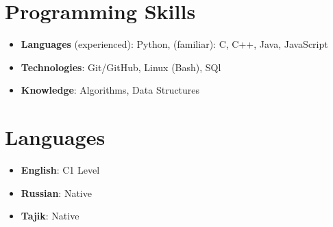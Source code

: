 \documentclass[letterpaper,10pt]{article}
\newcommand{\resumeSubHeadingListStart}{\begin{itemize}[leftmargin=*]}
\newcommand{\resumeSubHeadingListEnd}{\end{itemize}}
\begin{document}
\section{Programming Skills}
 \resumeSubHeadingListStart
   \item{
     \textbf{Languages} (experienced){: Python,  (familiar): C, C++, Java, JavaScript  }
   }\vspace{-4pt}
   \item{
     \textbf{Technologies}{: Git/GitHub, Linux (Bash), SQl}
   }
   \vspace{-4pt}
   \item{
     \textbf{Knowledge}{: Algorithms, Data Structures}
   }
 \resumeSubHeadingListEnd

\section{Languages}
 \resumeSubHeadingListStart
   \item{
     \textbf{English}: C1 Level
   }\vspace{-5pt}
   \item{
     \textbf{Russian}: Native
   }
   \vspace{-5pt}
   \item{
     \textbf{Tajik}: Native
   }
 \resumeSubHeadingListEnd


\end{document}
